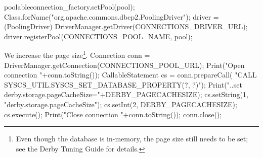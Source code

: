 \documentclass{article}
\def\nwendcode{\endtrivlist \endgroup}      %
\let\nwdocspar=\par
\theoremstyle{definition}                   %
\begin{document}
poolableconnection_factory.setPool(pool);
Class.forName("org.apache.commons.dbcp2.PoolingDriver");
driver = (PoolingDriver) DriverManager.getDriver(CONNECTIONS_DRIVER_URL);
driver.registerPool(CONNECTIONS_POOL_NAME, pool);
\nwendcode{}\nwdocspar
We increase the page size\footnote{Even though the database is in-memory, the
page size still needs to be set; see the Derby Tuning Guide for details.}.
\nwenddocs{}\endmoddef{}
Connection conn = DriverManager.getConnection(CONNECTIONS_POOL_URL);
Print("Open connection "+conn.toString());
CallableStatement cs = conn.prepareCall(
  "CALL SYSCS_UTIL.SYSCS_SET_DATABASE_PROPERTY(?, ?)");
Print("..set derby.storage.pageCacheSize="+DERBY_PAGECACHESIZE);
cs.setString(1, "derby.storage.pageCacheSize");
cs.setInt(2, DERBY_PAGECACHESIZE);
cs.execute();
Print("Close connection "+conn.toString());
conn.close();
\nwendcode{}\nwdocspar
\end{document}
